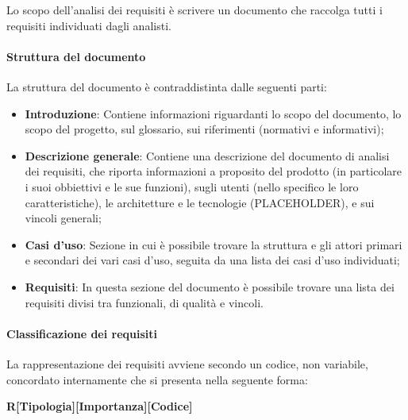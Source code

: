 \documentclass[../norme-di-progetto.tex]{subfiles}
\begin{document}
Lo scopo dell'analisi dei requisiti è scrivere un documento che raccolga tutti i requisiti individuati dagli analisti.

\paragraph{Struttura del documento}

La struttura del documento è contraddistinta dalle seguenti parti:
\begin{itemize}
    \item \textbf{Introduzione}: Contiene informazioni riguardanti lo scopo del documento, lo scopo del progetto, sul glossario, sui riferimenti (normativi e informativi);
    \item \textbf{Descrizione generale}: Contiene una descrizione del documento di analisi dei requisiti, che riporta informazioni a proposito del prodotto (in particolare i suoi obbiettivi e le sue funzioni), sugli utenti (nello specifico le loro caratteristiche), le architetture e le tecnologie (PLACEHOLDER), e sui vincoli generali;
    \item \textbf{Casi d'uso}: Sezione in cui è possibile trovare la struttura e gli attori primari e secondari dei vari casi d'uso, seguita da una lista dei casi d'uso individuati;
    \item \textbf{Requisiti}: In questa sezione del documento è possibile trovare una lista dei requisiti divisi tra funzionali, di qualità e vincoli.
\end{itemize}

\paragraph{Classificazione dei requisiti}
La rappresentazione dei requisiti avviene secondo un codice, non variabile, concordato internamente che si presenta nella seguente forma:\\
\begin{center}
    \textbf{R[Tipologia][Importanza][Codice]}
\end{center}
\end{document}
